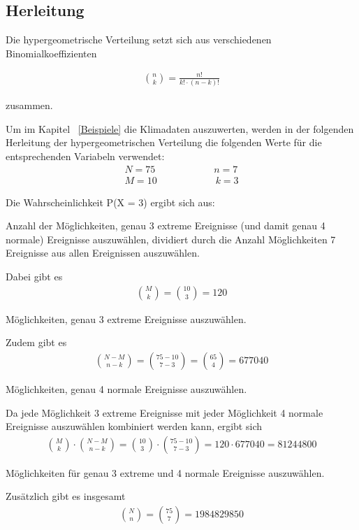 \begin{refsection}
\subsection{Herleitung}
Die hypergeometrische Verteilung setzt sich aus verschiedenen Binomialkoeffizienten

\begin{align*}
\binom{n}{k} = \frac {n!}{k! \cdot (n-k)!} 
\end{align*}

zusammen.

Um im Kapitel ~\ref{Beispiele}  die Klimadaten auszuwerten, werden in der folgenden Herleitung der hypergeometrischen Verteilung die folgenden Werte für die entsprechenden Variabeln verwendet:
\begin{align*}
N = 75 \quad \quad \quad \quad \quad \quad 
n = 7 \\
M = 10 \quad \quad \quad \quad \quad \quad 
k = 3
\end{align*}

Die Wahrscheinlichkeit P(X = 3) ergibt sich aus:

Anzahl der Möglichkeiten, genau 3 extreme Ereignisse (und damit genau 4 normale) Ereignisse auszuwählen, dividiert durch die Anzahl Möglichkeiten 7 Ereignisse aus allen Ereignissen auszuwählen.
 
Dabei gibt es
\begin{align*}
\binom{M}{k} = \binom{10}{3} = 120
\end{align*}

Möglichkeiten, genau 3 extreme Ereignisse auszuwählen.

Zudem gibt es 
\begin{align*}
\binom{N-M}{n-k} = \binom{75-10}{7-3} = \binom{65}{4} = 677040
\end{align*}

Möglichkeiten, genau 4 normale Ereignisse auszuwählen.

Da jede Möglichkeit 3 extreme Ereignisse mit jeder Möglichkeit 4 normale Ereignisse auszuwählen kombiniert werden kann, ergibt sich
\begin{align*}
\binom{M}{k} \cdot \binom{N-M}{n-k} = \binom{10}{3} \cdot \binom{75-10}{7-3} = 120 
\cdot 677040 = 81244800
\end{align*}

Möglichkeiten für genau 3 extreme und 4 normale Ereignisse auszuwählen.


Zusätzlich gibt es insgesamt
\begin{align*}
\binom{N}{n} = \binom{75}{7} = 1984829850
\end{align*}


\end{refsection}
